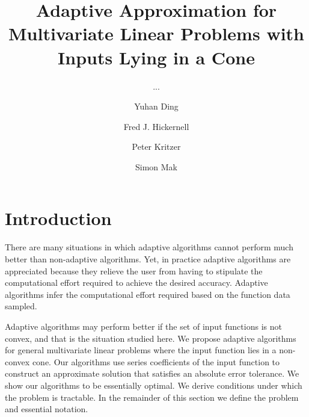 \documentclass[USenglish]{article}
\begin{document}

  \author[1]{Yuhan Ding}
  \author*[2]{Fred J. Hickernell}
  \author[3]{Peter Kritzer} 
  \author[4]{Simon Mak}
  \title{Adaptive Approximation for Multivariate Linear Problems with Inputs Lying in a Cone}
  \subtitle{...}
  \aop

\maketitle


\section{Introduction} 

There are many situations in which adaptive algorithms cannot perform much better than non-adaptive algorithms.  Yet, in practice adaptive algorithms are appreciated because they relieve the user from having to stipulate the computational effort required to achieve the desired accuracy.  Adaptive algorithms infer the computational effort required based on the function data sampled.

Adaptive algorithms may perform better if the set of input functions is not convex, and that is the situation studied here. We propose adaptive algorithms for general multivariate linear problems where the input function lies in a non-convex cone.  Our algorithms use series coefficients of the input function to construct an approximate solution that satisfies an absolute error tolerance.  We show our algorithms to be essentially optimal.  We derive conditions under which the problem is tractable.  In the remainder of this section we define the problem and essential notation.

\end{document}
